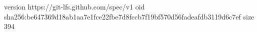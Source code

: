 version https://git-lfs.github.com/spec/v1
oid sha256:be647369d18ab1aa7e1fce22fbe7d8fccb7f19bf570d56fadeafdb3119d6c7ef
size 394
